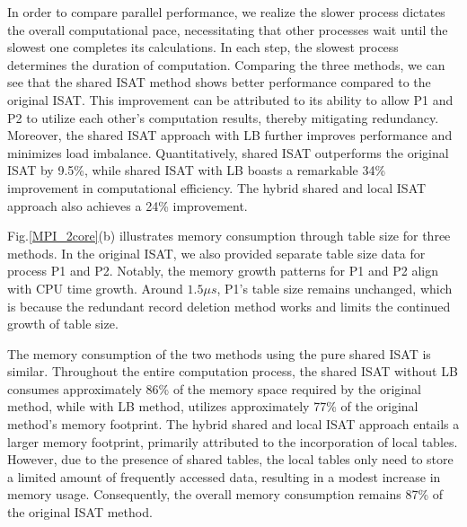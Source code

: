 In order to compare parallel performance, we realize the slower process dictates the overall computational pace, necessitating that other processes wait until the slowest one completes its calculations. In each step, the slowest process determines the duration of computation. Comparing the three methods, we can see that the shared ISAT method shows better performance compared to the original ISAT. This improvement can be attributed to its ability to allow P1 and P2 to utilize each other's computation results, thereby mitigating redundancy. Moreover, the shared ISAT approach with LB further improves performance and minimizes load imbalance. Quantitatively, shared ISAT outperforms the original ISAT by 9.5\%, while shared ISAT with LB boasts a remarkable 34\% improvement in computational efficiency. The hybrid shared and local ISAT approach also achieves a 24\% improvement.


Fig.\ref{MPI_2core}(b) illustrates memory consumption through table size for three methods. In the original ISAT, we also provided separate table size data for process P1 and P2. Notably, the memory growth patterns for P1 and P2 align with CPU time growth. Around $1.5 \mu s$, P1's table size remains unchanged, which is because the redundant record deletion method works and limits the continued growth of table size.

The memory consumption of the two methods using the pure shared ISAT is similar. Throughout the entire computation process, the shared ISAT without LB consumes approximately 86\% of the memory space required by the original method, while with LB method, utilizes approximately 77\% of the original method's memory footprint. The hybrid shared and local ISAT approach entails a larger memory footprint, primarily attributed to the incorporation of local tables. However,  due to the presence of shared tables, the local tables only need to store a limited amount of frequently accessed data, resulting in a modest increase in memory usage. Consequently, the overall memory consumption remains 87\% of the original ISAT method.


